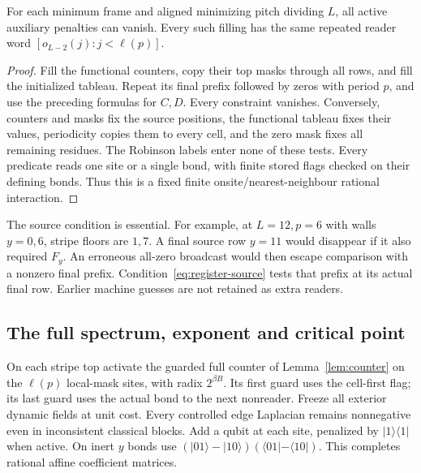 \begin{lemma}\label{lem:register-completion}
For each minimum frame and aligned minimizing pitch dividing $L$,
all active auxiliary penalties can vanish. Every such filling has
the same repeated reader word $[o_{L-2}(j):j<\ell(p)]$.
\end{lemma}
\begin{proof}
Fill the functional counters, copy their top masks through all rows,
and fill the initialized tableau. Repeat its final prefix followed
by zeros with period $p$, and use the preceding formulas for $C,D$.
Every constraint vanishes. Conversely, counters and masks fix the
source positions, the functional tableau fixes their values,
periodicity copies them to every cell, and the zero mask fixes all
remaining residues. The Robinson labels enter none of these tests.
Every predicate reads one site or a single bond, with finite stored
flags checked on their defining bonds. Thus this is a fixed finite
onsite/nearest-neighbour rational interaction.
\end{proof}

The source condition is essential. For example, at $L=12,p=6$ with
walls $y=0,6$, stripe floors are $1,7$. A final source row $y=11$
would disappear if it also required $F_y$. An erroneous all-zero
broadcast would then escape comparison with a nonzero final prefix.
Condition~\eqref{eq:register-source} tests that prefix at its actual
final row. Earlier machine guesses are not retained as extra readers.

\subsection{The full spectrum, exponent and critical point}
On each stripe top activate the guarded full counter of
Lemma~\ref{lem:counter} on the $\ell(p)$ local-mask sites, with
radix $2^{\beta B}$. Its first guard uses the cell-first flag; its
last guard uses the actual bond to the next nonreader. Freeze all
exterior dynamic fields at unit cost. Every controlled edge
Laplacian remains nonnegative even in inconsistent classical blocks.
Add a qubit at each site, penalized by $|1\rangle\langle1|$ when
active. On inert $y$ bonds use
$(|01\rangle-|10\rangle)(\langle01|-\langle10|)$.
This completes rational affine coefficient matrices.

